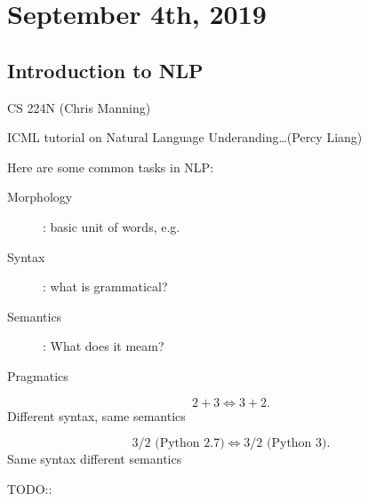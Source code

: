 \documentclass[../main/main.tex]{subfiles}
\begin{document}
\section{September  4th, 2019}
\subsection{Introduction to NLP}
\begin{description}
	\item[Reference Material] 
	\item CS 224N (Chris Manning)
	\item ICML tutorial on Natural Language Underanding\ldots (Percy Liang)
\end{description}
Here are some common tasks in NLP:
\begin{description}
	\item[Morphology]: basic unit of words, e.g. 
	\item[Syntax]: what is grammatical? 
	\item[Semantics]: What does it meam?
	\item[Pragmatics]
\end{description}
\begin{example}
	\[
	2+3\iff 3+2
	.\] Different syntax, same semantics
\end{example}
\begin{example}
	\[
		\text{3/2} \text{ (Python 2.7)} \iff \text{3/2} \text{ (Python 3)}
	.\] Same syntax different semantics
\end{example}
\begin{example}
	 TODO::
\end{example}
\end{document}
